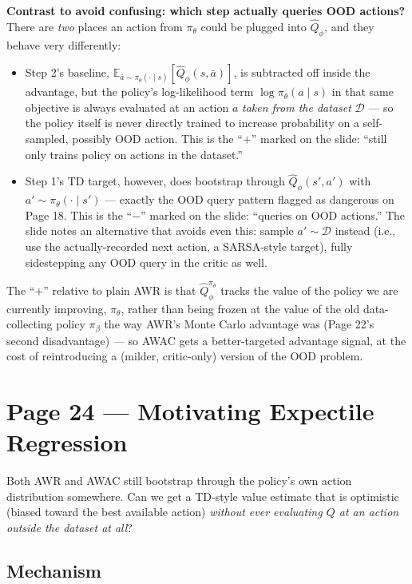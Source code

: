 \documentclass[11pt]{article}
\begin{document}
\textbf{Contrast to avoid confusing: which step actually queries OOD actions?} There are \emph{two} places an action from $\pi_\theta$ could be plugged into $\hat Q_\phi$, and they behave very differently:
\begin{itemize}
\item Step 2's baseline, $\mathbb{E}_{\bar a\sim\pi_\theta(\cdot\mid s)}[\hat Q_\phi(s,\bar a)]$, is subtracted off inside the advantage, but the policy's log-likelihood term $\log\pi_\theta(a\mid s)$ in that same objective is always evaluated at an action $a$ \emph{taken from the dataset} $\mathcal D$ --- so the policy itself is never directly trained to increase probability on a self-sampled, possibly OOD action. This is the ``$+$'' marked on the slide: ``still only trains policy on actions in the dataset.''
\item Step 1's TD target, however, does bootstrap through $\hat Q_\phi(s',a')$ with $a'\sim\pi_\theta(\cdot\mid s')$ --- exactly the OOD query pattern flagged as dangerous on Page 18. This is the ``$-$'' marked on the slide: ``queries on OOD actions.'' The slide notes an alternative that avoids even this: sample $a' \sim \mathcal D$ instead (i.e., use the actually-recorded next action, a SARSA-style target), fully sidestepping any OOD query in the critic as well.
\end{itemize}
The ``$+$'' relative to plain AWR is that $\hat Q^{\pi_\theta}_\phi$ tracks the value of the policy we are currently improving, $\pi_\theta$, rather than being frozen at the value of the old data-collecting policy $\pi_\beta$ the way AWR's Monte Carlo advantage was (Page 22's second disadvantage) --- so AWAC gets a better-targeted advantage signal, at the cost of reintroducing a (milder, critic-only) version of the OOD problem.

\section*{Page 24 --- Motivating Expectile Regression}

Both AWR and AWAC still bootstrap through the policy's own action distribution somewhere. Can we get a TD-style value estimate that is optimistic (biased toward the best available action) \emph{without ever evaluating $Q$ at an action outside the dataset at all}?

\subsection*{Mechanism}
\end{document}
